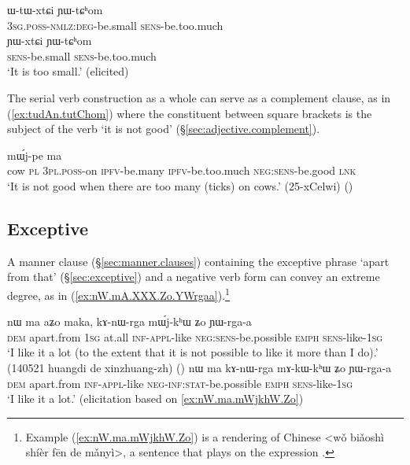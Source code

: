\begin{exe}
\ex 
\begin{xlist}
\ex  \label{ex:WtWxtCi.YWtChom}
\gll ɯ-tɯ-xtɕi ɲɯ-tɕʰom \\
\textsc{3sg}.\textsc{poss}-\textsc{nmlz}:\textsc{deg}-be.small \textsc{sens}-be.too.much \\
\ex  \label{ex:YWxtCi.YWtChom}
\gll ɲɯ-xtɕi ɲɯ-tɕʰom \\
\textsc{sens}-be.small \textsc{sens}-be.too.much \\
\glt `It is too small.' (elicited)
\end{xlist}
\end{exe}

The serial verb construction as a whole can serve as a complement clause, as in (\ref{ex:tudAn.tutChom}) where the constituent between square brackets is the subject of the verb  `it is not good' (§\ref{sec:adjective.complement}).

\begin{exe}
\ex \label{ex:tudAn.tutChom}
 mɯ́j-pe ma \\
cow \textsc{pl} \textsc{3pl}.\textsc{poss}-on \textsc{ipfv}-be.many \textsc{ipfv}-be.too.much \textsc{neg}:\textsc{sens}-be.good \textsc{lnk} \\
\glt `It is not good when there are too many (ticks) on cows.' (25-xCelwi)
()
\end{exe}

\subsection{Exceptive}
A manner clause (§\ref{sec:manner.clauses}) containing the exceptive phrase  `apart from that' (§\ref{sec:exceptive}) and a negative verb form can convey an extreme degree, as in (\ref{ex:nW.mA.XXX.Zo.YWrgaa}).\footnote{Example (\ref{ex:nW.ma.mWjkhW.Zo}) is a rendering of Chinese  <wǒ biǎoshì shíèr fēn de mǎnyì>, a sentence that plays on the expression . 
}

\begin{exe}
\ex \label{ex:nW.mA.XXX.Zo.YWrgaa}
\begin{xlist}
\ex \label{ex:nW.ma.mWjkhW.Zo}
\gll  nɯ ma aʑo maka, kɤ-nɯ-rga mɯ́j-kʰɯ ʑo ɲɯ-rga-a \\
\textsc{dem} apart.from \textsc{1sg} at.all \textsc{inf}-\textsc{appl}-like \textsc{neg}:\textsc{sens}-be.possible \textsc{emph} \textsc{sens}-like-\textsc{1sg} \\
\glt `I like it a lot (to the extent that it is not possible to like it more than I do).' (140521 huangdi de xinzhuang-zh)
()
\ex \label{ex:nW.ma.mAkWkhW.Zo}
\gll  nɯ ma kɤ-nɯ-rga mɤ-kɯ-kʰɯ ʑo ɲɯ-rga-a \\
\textsc{dem} apart.from \textsc{inf}-\textsc{appl}-like \textsc{neg}-\textsc{inf}:\textsc{stat}-be.possible \textsc{emph} \textsc{sens}-like-\textsc{1sg} \\
\glt `I like it a lot.' (elicitation based on \ref{ex:nW.ma.mWjkhW.Zo})
\end{xlist}
\end{exe}


